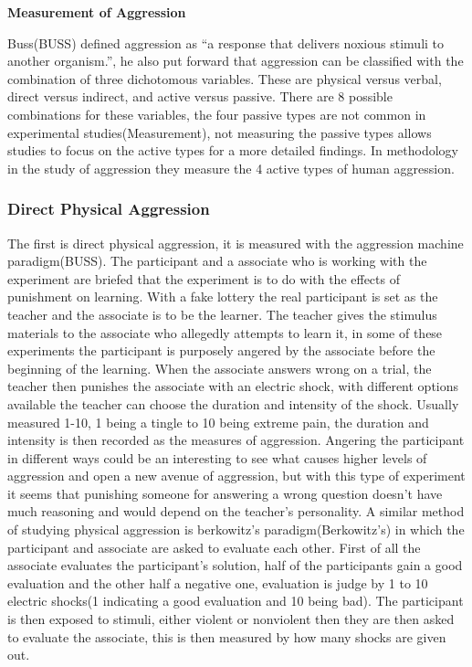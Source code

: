 \documentclass[journal]{IEEEtran}
\begin{document}
        \textbf{Measurement of Aggression}
        
                Buss(BUSS) defined aggression as “a response that delivers noxious stimuli to another organism.”, he also put forward that aggression can be classified with the combination of three dichotomous variables. These are physical versus verbal, direct versus indirect, and active versus passive. There are 8 possible combinations for these variables, the four passive types are not common in experimental studies(Measurement), not measuring the passive types allows studies to focus on the active types for a more detailed findings. In methodology in the study of aggression they measure the 4 active types of human aggression. 

    \subsubsection{Direct Physical Aggression}
        The first is direct physical aggression, it is measured with the aggression machine paradigm(BUSS). The participant and a associate who is working with the experiment are briefed that the experiment is to do with the effects of punishment on learning. With a fake lottery the real participant is set as the teacher and the associate is to be the learner. The teacher gives the stimulus materials to the associate who allegedly attempts to learn it, in some of these experiments the participant is purposely angered by the associate before the beginning of the learning. When the associate answers wrong on a trial, the teacher then punishes the associate with an electric shock, with different options available the teacher can choose the duration and intensity of the shock. Usually measured 1-10, 1 being a tingle to 10 being extreme pain, the duration and intensity is then recorded as the measures of aggression. Angering the participant in different ways could be an interesting to see what causes higher levels of aggression and open a new avenue of aggression, but with this type of experiment it seems that punishing someone for answering a wrong question doesn't have much reasoning and would depend on the teacher's personality.
        A similar method of studying physical aggression is berkowitz’s paradigm(Berkowitz’s) in which the participant and associate are asked to evaluate each other. First of all the associate evaluates the participant's solution, half of the participants gain a good evaluation and the other half a negative one, evaluation is judge by 1 to 10 electric shocks(1 indicating a good evaluation and 10 being bad). The participant is then exposed to stimuli, either violent or nonviolent then they are then asked to evaluate the associate, this is then measured by how many shocks are given out. 
\end{document}
